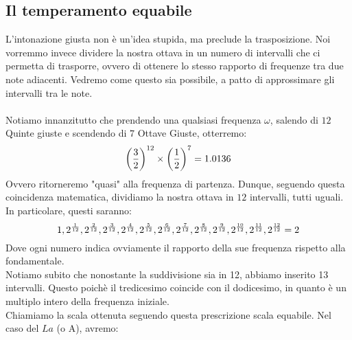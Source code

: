 \documentclass[12pt,a4paper]{report}
\theoremstyle{definition}
\theoremstyle{Theorem}
\theoremstyle{definition}
\theoremstyle{definition}
\theoremstyle{definition}
\begin{document}
	 \subsection{Il temperamento equabile}
	 L'intonazione giusta non è un'idea stupida, ma preclude la trasposizione. Noi vorremmo invece dividere la nostra ottava in un numero di intervalli che ci permetta di trasporre, ovvero di ottenere lo stesso rapporto di frequenze tra due note adiacenti. Vedremo come questo sia possibile, a patto di approssimare gli intervalli tra le note.\\
	 \\
	 Notiamo innanzitutto che prendendo una qualsiasi frequenza $\omega$, salendo di $12$ Quinte giuste e scendendo di $7$ Ottave Giuste, otterremo:
	 $$\bigg({3\over 2}\bigg)^{12}\times \bigg({1\over 2}\bigg)^7=1.0136$$
	 Ovvero ritorneremo "quasi" alla frequenza di partenza. Dunque, seguendo questa coincidenza matematica, dividiamo la nostra ottava in $12$ intervalli, tutti uguali. In particolare, questi saranno:
	 $$1,2^{1\over12},2^{2\over12},2^{3\over12},2^{4\over12},2^{5\over12},2^{6\over12},2^{7\over12},2^{8\over12},2^{9\over12},2^{10\over12},2^{11\over12},2^{12\over12}=2$$
	 Dove ogni numero indica ovviamente il rapporto della sue frequenza rispetto alla fondamentale.\\
	 Notiamo subito che nonostante la suddivisione sia in 12, abbiamo inserito 13 intervalli. Questo poichè il tredicesimo coincide con il dodicesimo, in quanto è un multiplo intero della frequenza iniziale.\\
	 Chiamiamo la scala ottenuta seguendo questa prescrizione scala equabile.
	 Nel caso del $La$ (o A), avremo:
	 \begin{center}
	 \end{center} 
\end{document}
